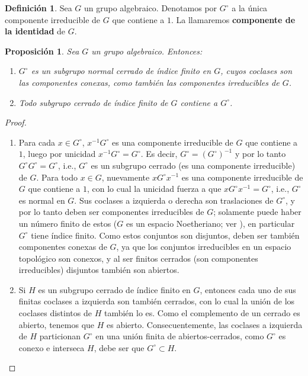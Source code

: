 \documentclass[spanish,10pt]{amsart}
\newtheorem{proposition}[theorem]{Proposición}
\theoremstyle{definition}
\newtheorem{definition}[theorem]{Definición}
\theoremstyle{remark}
\numberwithin{equation}{section}
\begin{document}
\begin{definition}
Sea $G$ un grupo algebraico. Denotamos por $G^\circ$ a la única componente irreducible de $G$ que contiene a $1$. La llamaremos \textbf{componente de la identidad} de $G$.
\end{definition}

\begin{proposition}\label{proposicion:componente de la identidad}
Sea $G$ un grupo algebraico. Entonces:
\begin{enumerate}[(1)]
\item $G^\circ$ es un subgrupo normal cerrado de índice finito en $G$, cuyos coclases son las componentes conexas, como también las componentes irreducibles de $G$.
\item Todo subgrupo cerrado de índice finito de $G$ contiene a $G^\circ$.
\end{enumerate}
\end{proposition}
\begin{proof}
\begin{enumerate}[(1)]
\item Para cada $x \in G^\circ$, $x^{-1} G^\circ$ es una componente irreducible de $G$ que contiene a $1$, luego por unicidad $x^{-1} G^\circ = G^{\circ}$. Es decir, $G^\circ = (G^{\circ})^{-1}$ y por lo tanto $G^\circ G^\circ = G ^\circ$, i.e., $G^\circ$ es un subgrupo cerrado (es una componente irreducible) de $G$. Para todo $x \in G$, nuevamente $x G^{\circ} x^{-1}$ es una componente irreducible de $G$ que contiene a $1$, con lo cual la unicidad fuerza a que $x G^\circ x^{-1} = G^{\circ}$, i.e., $G^\circ$ es normal en $G$. Sus coclases a izquierda o derecha son traslaciones de $G^\circ$, y por lo tanto deben ser componentes irreducibles de $G$; solamente puede haber un número finito de estos ($G$ es un espacio Noetheriano; ver \cite[Teorema 2.8.9]{notas_pedro}), en particular $G^\circ$ tiene índice finito. Como estos conjuntos son disjuntos, deben ser también componentes conexas de $G$, ya que los conjuntos irreducibles en un espacio topológico son conexos, y al ser finitos cerrados (son componentes irreducibles) disjuntos también son abiertos.
\item Si $H$ es un subgrupo cerrado de índice finito en $G$, entonces cada uno de sus finitas coclases a izquierda son también cerrados, con lo cual la unión de los coclases distintos de $H$ también lo es. Como el complemento de un cerrado es abierto, tenemos que $H$ es abierto. Consecuentemente, las coclases a izquierda de $H$ particionan $G^\circ$ en una unión finita de abiertos-cerrados, como $G^\circ$ es conexo e interseca $H$, debe ser que $G^\circ \subset H$.
\end{enumerate}
\end{proof}
\end{document}
